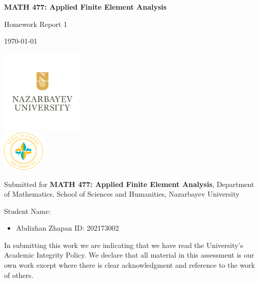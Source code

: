 \documentclass[12pt, a4paper]{article}
\begin{document}
\begin{titlepage}
    \centering

    \vspace*{0.5cm}
    {\Large\bfseries MATH 477: Applied Finite Element Analysis\par}

    \vspace{1cm}
    {\large Homework Report 1\par}

    \vspace{0.5cm}
    {\today\par}

    \vspace{1pt}
    \includegraphics[width=0.3\textwidth]{NU-logo.png}\\
    \includegraphics[width=0.15\textwidth]{sosah-logo.png}

    \vspace{0.5cm}
    Submitted for {\bf MATH 477: Applied Finite Element Analysis}, Department of Mathematics, School of Sciences and Humanities, Nazarbayev University

    \vspace{0.5cm}
    {\large Student Name:\par}
    \begin{itemize}[leftmargin=5cm,rightmargin=4cm]
        \item Abdizhan Zhapan \quad ID: 202173002
    \end{itemize}

    \vspace{0.5cm}

    \vspace{0.5cm}
    {\footnotesize In submitting this work we are indicating
    that we have read the University's Academic Integrity Policy. We
    declare that all material in this assessment is our own work except
    where there is clear acknowledgment and reference to the work of
    others.\par}
\end{titlepage}
\end{document}
